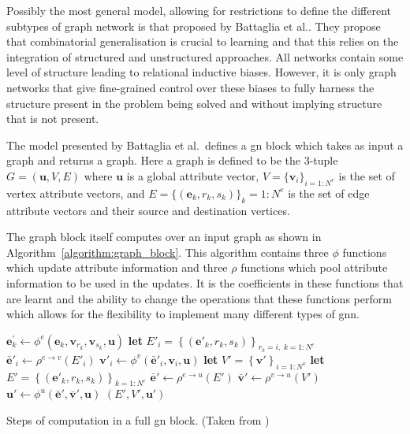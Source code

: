 Possibly the most general model, allowing for restrictions to define the different subtypes of graph network is that proposed by Battaglia et al.\cite{battaglia2018relational}. They propose that combinatorial generalisation is crucial to learning and that this relies on the integration of structured and unstructured approaches. All networks contain some level of structure leading to relational inductive biases. However, it is only graph networks that give fine-grained control over these biases to fully harness the structure present in the problem being solved and without implying structure that is not present.

The model presented by Battaglia et al.\ defines a \ac{gn} block which takes as input a graph and returns a graph. Here a graph is defined to be the 3-tuple $G = (\bm{u}, V, E)$ where $\bm{u}$ is a global attribute vector, $V = \{\bm{v}_i\}_{i=1:N^v}$ is the set of vertex attribute vectors, and $E = \{(\bm{e}_k, r_k, s_k)\}_k=1:N^e$ is the set of edge attribute vectors and their source and destination vertices.

The graph block itself computes over an input graph as shown in Algorithm~\ref{algorithm:graph_block}. This algorithm contains three $\phi$ functions which update attribute information and three $\rho$ functions which pool attribute information to be used in the updates. It is the coefficients in these functions that are learnt and the ability to change the operations that these functions perform which allows for the flexibility to implement many different types of \ac{gnn}.

\begin{algorithm}[t]
\small
\begin{algorithmic}
        \State $\mathbf{e}_k^\prime\gets \phi^e\left(\mathbf{e}_k, \mathbf{v}_{r_k}, \mathbf{v}_{s_k}, \mathbf{u} \right)$
    \EndFor
        \State \textbf{let} $E'_i = \left\{\left(\mathbf{e}'_k, r_k, s_k \right)\right\}_{r_k=i,\; k=1:N^e}$
        \State $\mathbf{\bar{e}}'_i \gets \rho^{e \rightarrow v}\left(E'_i\right)$
        \State $\mathbf{v}'_i \gets \phi^v\left(\mathbf{\bar{e}}'_i, \mathbf{v}_i, \mathbf{u}\right)$
    \EndFor
    \State \textbf{let} $V' = \left\{\mathbf{v}'\right\}_{i=1:N^v}$
    \State \textbf{let} $E' = \left\{\left(\mathbf{e}'_k, r_k, s_k \right)\right\}_{k=1:N^e}$
    \State $\mathbf{\bar{e}}' \gets \rho^{e \rightarrow u}\left(E'\right)$
    \State $\mathbf{\bar{v}}' \gets \rho^{v \rightarrow u}\left(V'\right)$
    \State $\mathbf{u}' \gets \phi^u\left(\mathbf{\bar{e}}', \mathbf{\bar{v}}', \mathbf{u}\right)$
    \State \Return $(E', V', \mathbf{u}')$
\EndFunction
\end{algorithmic}
\caption{Steps of computation in a full \ac{gn} block. (Taken from \cite{battaglia2018relational})}
\label{algorithm:graph_block}
\end{algorithm}


